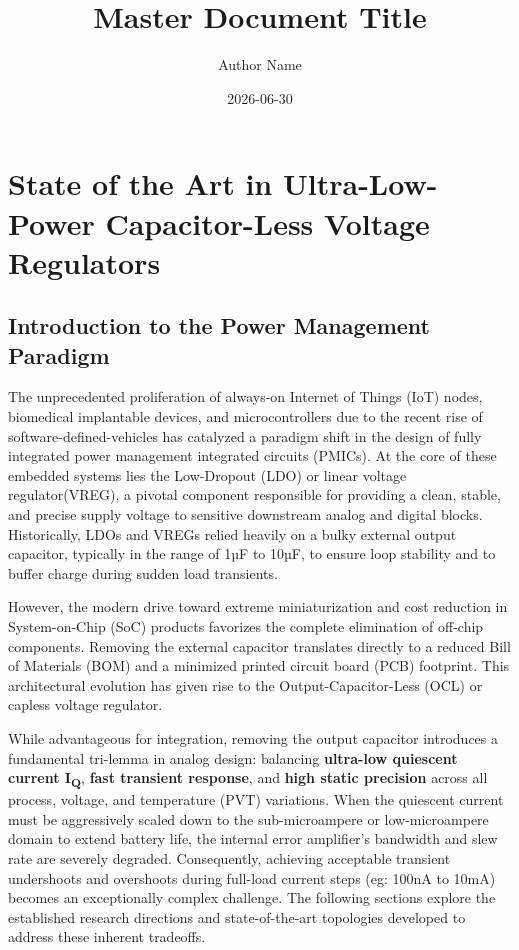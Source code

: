 \documentclass[
]{article}
\title{Master Document Title}
\author{Author Name}
\date{2026-06-30}
\let\oldsection\section
\renewcommand{\section}{\clearpage\oldsection}
\begin{document}
\maketitle

\section{State of the Art in Ultra-Low-Power Capacitor-Less Voltage
Regulators}\label{_state_of_the_art_in_ultra_low_power_capacitor_less_voltage_regulators}

\subsection{Introduction to the Power Management
Paradigm}\label{_introduction_to_the_power_management_paradigm}

The unprecedented proliferation of always-on Internet of Things (IoT)
nodes, biomedical implantable devices, and microcontrollers due to the
recent rise of software-defined-vehicles has catalyzed a paradigm shift
in the design of fully integrated power management integrated circuits
(PMICs). At the core of these embedded systems lies the Low-Dropout
(LDO) or linear voltage regulator(VREG), a pivotal component responsible
for providing a clean, stable, and precise supply voltage to sensitive
downstream analog and digital blocks. Historically, LDOs and VREGs
relied heavily on a bulky external output capacitor, typically in the
range of 1µF to 10µF, to ensure loop stability and to buffer charge
during sudden load transients.

However, the modern drive toward extreme miniaturization and cost
reduction in System-on-Chip (SoC) products favorizes the complete
elimination of off-chip components. Removing the external capacitor
translates directly to a reduced Bill of Materials (BOM) and a minimized
printed circuit board (PCB) footprint. This architectural evolution has
given rise to the Output-Capacitor-Less (OCL) or capless voltage
regulator.

While advantageous for integration, removing the output capacitor
introduces a fundamental tri-lemma in analog design: balancing
\textbf{ultra-low quiescent current I\textsubscript{Q}}, \textbf{fast
transient response}, and \textbf{high static precision} across all
process, voltage, and temperature (PVT) variations. When the quiescent
current must be aggressively scaled down to the sub-microampere or
low-microampere domain to extend battery life, the internal error
amplifier's bandwidth and slew rate are severely degraded. Consequently,
achieving acceptable transient undershoots and overshoots during
full-load current steps (eg: 100nA to 10mA) becomes an exceptionally
complex challenge. The following sections explore the established
research directions and state-of-the-art topologies developed to address
these inherent tradeoffs.
\end{document}
